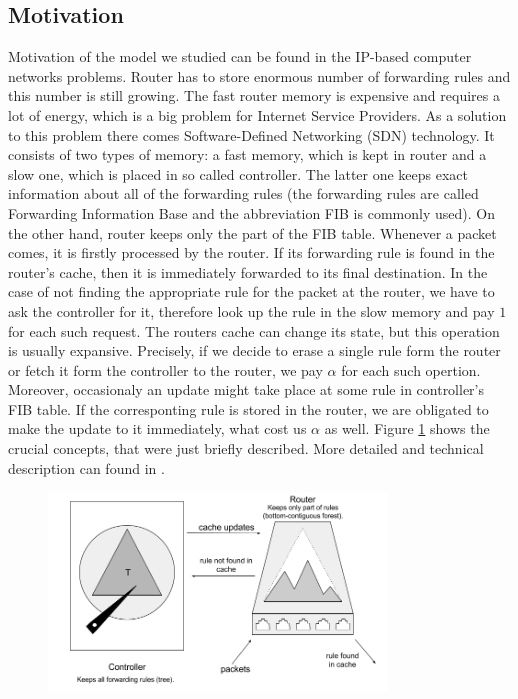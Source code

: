 \subsection{Motivation} Motivation of the model we studied can be found in the
IP-based computer networks problems. Router has to store enormous number of
forwarding rules and this number is still growing. The fast router memory is
expensive and requires a lot of energy, which is a big problem for Internet
Service Providers. As a solution to this problem there comes Software-Defined
Networking (SDN) technology. It consists of two types of memory: a fast memory,
which is kept in router and a slow one, which is placed in so called controller.
The latter one keeps exact information about all of the forwarding rules (the
forwarding rules are called Forwarding Information Base and the abbreviation FIB
is commonly used).  On the other hand, router keeps only the part of the FIB
table. Whenever a packet comes, it is firstly processed by the router. If its
forwarding rule is found in the router's cache, then it is immediately forwarded
to its final destination.  In the case of not finding the appropriate rule for
the packet at the router, we have to ask the controller for it, therefore look
up the rule in the slow memory and pay $1$ for each such request. The routers
cache can change its state, but this operation is usually expansive. Precisely,
if we decide to erase a single rule form the router or fetch it form the
controller to the router, we pay $\alpha$ for each such opertion.  Moreover,
occasionaly an update might take place at some rule in controller's FIB table.
If the corresponting rule is stored in the router, we are obligated to make the
update to it immediately, what cost us $\alpha$ as well. Figure
\ref{fig:motivation} shows the crucial concepts, that were just briefly
described. More detailed and technical description can found in \cite{sdn}.
\begin{figure} \begin{center}
\includegraphics[width=0.8\textwidth]{motivation.png} \end{center} \caption{}
\label{fig:motivation} \end{figure}

